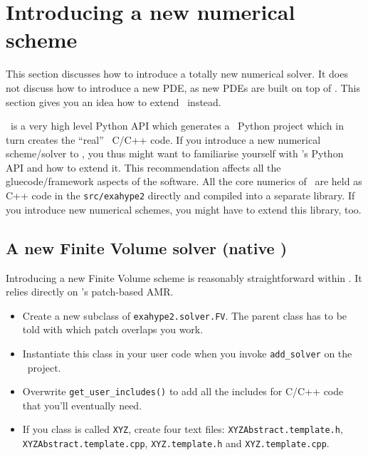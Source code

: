 \section{Introducing a new numerical scheme}

This section discusses how to introduce a totally new numerical solver. 
It does not discuss how to introduce a new PDE, as new PDEs are built on top of
\ExaHyPE.
This section gives you an idea how to extend \ExaHyPE\ instead.

\begin{remark}
  \ExaHyPE\ is a very high level Python API which generates a \Peano\
   Python project which in turn creates the ``real'' \Peano\ C/C++ code. If you
   introduce a new numerical scheme/solver to \ExaHyPE, you thus might want to
   familiarise yourself with \Peano's Python API and how to extend it. This
   recommendation affects all the gluecode/framework aspects of the software.
   All the core numerics of \ExaHyPE\ are held as C++ code in the
   \texttt{src/exahype2} directly and compiled into a separate library. If you
   introduce new numerical schemes, you might have to extend this library, too.
\end{remark}



\subsection{A new Finite Volume solver (native \ExaHyPE)}

Introducing a new Finite Volume scheme is reasonably straightforward within
\ExaHyPE.
It relies directly on \Peano's patch-based AMR.


\begin{itemize}
  \item Create a new subclass of \texttt{exahype2.solver.FV}. The parent class
  has to be told with which patch overlaps you work.
  \item Instantiate this class in your user code when you invoke
  \texttt{add\_solver} on the \ExaHyPE\ project.
  \item Overwrite \texttt{get\_user\_includes()} to add all the includes for
  C/C++ code that you'll eventually need. 
  \item If you class is called \texttt{XYZ}, create four text files:
  \texttt{XYZAbstract.template.h}, \linebreak \texttt{XYZAbstract.template.cpp},
  \texttt{XYZ.template.h} and \texttt{XYZ.template.cpp}.
\end{itemize}

